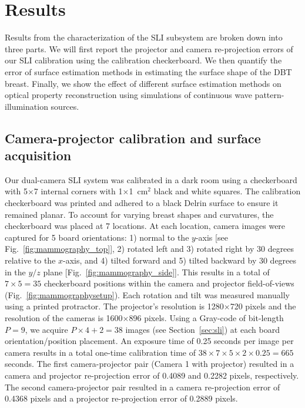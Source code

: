 \section{Results}
\label{chap:omci:results} 
Results from the characterization of the \ac{SLI} subsystem are broken down into three parts. We will first report the projector and camera re-projection errors of our \ac{SLI} calibration using the calibration checkerboard. We then quantify the error of surface estimation methods in estimating the surface shape of the \ac{DBT} breast. Finally, we show the effect of different surface estimation methods on optical property reconstruction using simulations of continuous wave pattern-illumination sources. 


\subsection{Camera-projector calibration and surface acquisition}
\label{ssec:calibrationresults}
Our dual-camera \ac{SLI} system was calibrated in a dark room using a checkerboard with 5$\times$7 internal corners with 1$\times$1~cm$^2$ black and white squares. The calibration checkerboard was printed and adhered to a black Delrin surface to ensure it remained planar. To account for varying breast shapes and curvatures, the checkerboard was placed at 7 locations. At each location, camera images were captured for 5 board orientations: 1) normal to the $y$-axis [see Fig.~\ref{fig:mammography_top}], 2) rotated left and 3) rotated right by 30 degrees relative to the $x$-axis, and 4) tilted forward and 5) tilted backward by 30 degrees in the $y/z$ plane [Fig.~\ref{fig:mammography_side}]. This results in a total of $7\times5=35$ checkerboard positions within the camera and projector field-of-views (Fig.~\ref{fig:mammographysetup}). Each rotation and tilt was measured manually using a printed protractor. The projector's resolution is 1280$\times$720 pixels and the resolution of the cameras is 1600$\times$896 pixels. Using a Gray-code of bit-length $P=9$, we acquire $P\times 4 + 2 = 38$ images (see Section~\ref{sec:sli}) at each board orientation/position placement. An exposure time of 0.25 seconds per image per camera results in a total one-time calibration time of $38 \times 7 \times 5 \times 2 \times 0.25 = 665$ seconds. The first camera-projector pair (Camera 1 with projector) resulted in a camera and projector re-projection error of 0.4089 and 0.2282 pixels, respectively. The second camera-projector pair resulted in a camera re-projection error of 0.4368 pixels and a projector re-projection error of 0.2889 pixels.

